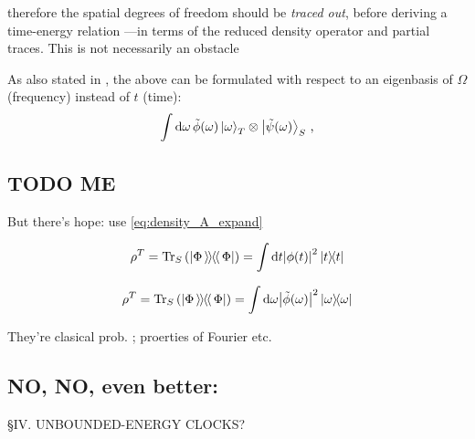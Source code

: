 therefore the spatial degrees of freedom should be \emph{traced out},
before deriving a time-energy relation 
---in terms of the reduced density operator and partial traces.
This is not necessarily an obstacle

As also stated in \cite{Lloyd:Time},
the above can be formulated with respect to an eigenbasis of $\Omega$ (frequency)
instead of $t$ (time):
\begin{equation}
  \int \dd \omega \, \tilde{\phi}(\omega) \ket{\omega}_T \otimes \ket{\tilde{\psi}(\omega)}_S \, \text{,}
\end{equation}


\subsection{TODO ME}

But there's hope: use \eqref{eq:density_A_expand}

\[
  \rho^T = \Tr_S\qty(\left| \Phi \left\rangle\hspace{-0.115em}\left\rangle \hspace{-0.115em} \right\langle\hspace{-0.115em}\right\langle \Phi \right|) = \int \dd t \abs{\phi(t)}^2 \ketbra{t}{t} 
\]

\[
  \rho^T = \Tr_S\qty(\left| \Phi \left\rangle\hspace{-0.115em}\left\rangle \hspace{-0.115em} \right\langle\hspace{-0.115em}\right\langle \Phi \right|) = \int \dd \omega \abs{\tilde{\phi}(\omega)}^2 \ketbra{\omega}{\omega} 
\]

They're clasical prob. ; proerties of Fourier etc.

\subsection{NO, NO, even better:}
\cite{Maccone:Pauli} \S IV.  UNBOUNDED-ENERGY CLOCKS?